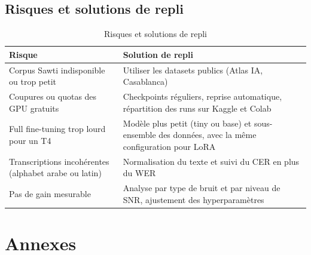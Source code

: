 \documentclass[12pt,a4paper]{report}
\begin{document}
\section{Risques et solutions de repli}
\begin{table}[h]
  \centering
  \small
  \begin{tabularx}{\textwidth}{XX}
    \toprule
    \textbf{Risque} & \textbf{Solution de repli} \\
    \midrule
    Corpus Sawti indisponible ou trop petit & Utiliser les datasets publics
    (Atlas IA, Casablanca) \\
    \addlinespace
    Coupures ou quotas des GPU gratuits & Checkpoints réguliers, reprise
    automatique, répartition des runs sur Kaggle et Colab \\
    \addlinespace
    Full fine-tuning trop lourd pour un T4 & Modèle plus petit (tiny ou base) et
    sous-ensemble des données, avec la même configuration pour LoRA \\
    \addlinespace
    Transcriptions incohérentes (alphabet arabe ou latin) & Normalisation du texte
    et suivi du CER en plus du WER \\
    \addlinespace
    Pas de gain mesurable & Analyse par type de bruit et par niveau de SNR,
    ajustement des hyperparamètres \\
    \bottomrule
  \end{tabularx}
  \caption{Risques et solutions de repli}
  \label{tab:risques}
\end{table}

\chapter{Annexes}
\end{document}
